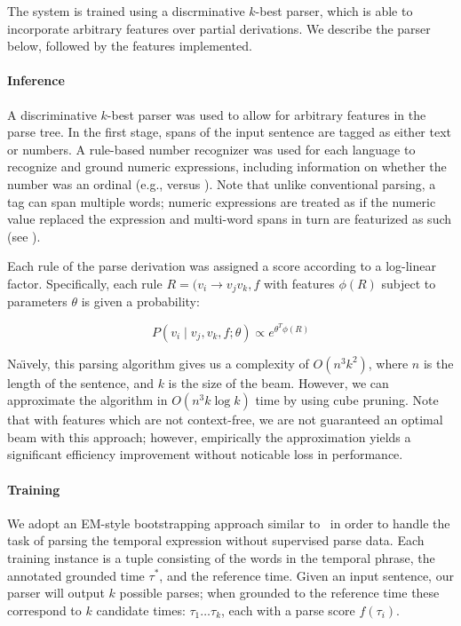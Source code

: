 The system is trained using a discrminative $k$-best parser, which is able to
  incorporate arbitrary features over partial derivations.
We describe the parser below, followed by the features implemented.

\paragraph{Inference}
A discriminative $k$-best parser was used to allow for arbitrary features
  in the parse tree.
In the first stage, spans of the input sentence are tagged as either text
  or numbers.
A rule-based number recognizer was used for each language to recognize and
  ground numeric expressions, including information on whether the number was
  an ordinal (e.g.,  versus ).
Note that unlike conventional parsing, a tag can span multiple words;
  numeric expressions are treated as if the numeric value replaced the
  expression and multi-word spans in turn are featurized as such
  (see ).

Each rule of the parse derivation was assigned a score according to a log-linear
  factor.
Specifically, each rule $R = (v_i \rightarrow v_j v_k, f$
  with features $\phi(R)$ subject to parameters
  $\theta$ is given a probability:

\begin{equation}
P(v_i \mid v_j, v_k, f; \theta) \propto e^{ \theta^T \phi(R) }
\end{equation}

Na\"{\i}vely, this parsing algorithm gives us a complexity of $O(n^3 k^2)$,
  where $n$ is the length of the sentence, and $k$ is the size of the beam.
However, we can approximate the algorithm in $O(n^3 k \log k)$ time by using
  cube pruning\needcite.
Note that with features which are not context-free, we are not
  guaranteed an optimal beam with this approach; however, empirically
  the approximation yields a significant efficiency improvement without
  noticable loss in performance.

\paragraph{Training}
We adopt an EM-style bootstrapping approach similar to \me\ in order to handle
  the task of parsing the temporal expression without supervised parse data.
Each training instance is a tuple consisting of the words in the temporal
	phrase, the annotated grounded time $\tau^*$, and the reference time.
Given an input sentence, our parser will output $k$ possible parses; when
  grounded to the reference time these correspond to $k$ candidate times:
  $\tau_1 \dots \tau_k$, each with a parse score $f(\tau_i)$.

